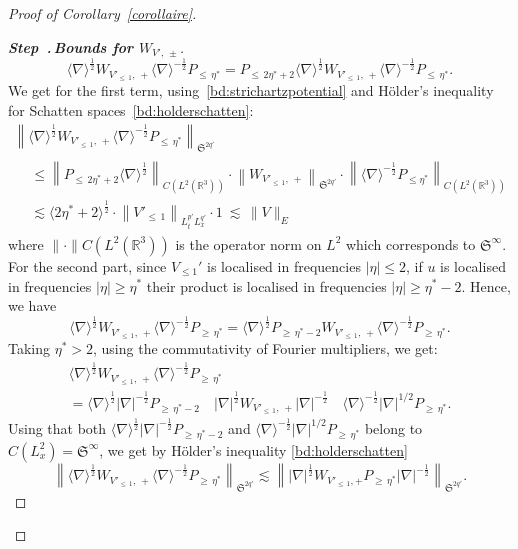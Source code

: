 \documentclass[AHL, Unicode, longabstracts,published]{cedram}
\newcommand{\R}{\mathbb{R}}
\newcommand{\frkS}{\mathfrak{S}}
\newcommand{\an}[1]{\langle #1 \rangle}
\newcounter{stepcount}
\newenvironment{step}[1]{\refstepcounter{stepcount}\begin{proof}[{\bf{Step~\thestepcount}{.\,\emph{#1}}}]}{\let\qed\relax\end{proof}}
\begin{document}
\begin{proof}[Proof of Corollary~\ref{corollaire}]
\begin{step}{{Bounds for $W_{V',\,\pm}$}}
\[
\an{\nabla}^{\frac12} W_{V'_{\leq\,1},\,+}\an{\nabla}^{-\frac12} P_{\leq\,\eta^*} = P_{\leq\,2\eta^*+2} \an{\nabla}^{\frac12} W_{V'_{\leq\,1},\,+}\an{\nabla}^{-\frac12} P_{\leq\,\eta^*}.
\]
We get for the first term, using~\eqref{bd:strichartzpotential} and H\"older's inequality for Schatten spaces~\eqref{bd:holderschatten}:
\begin{multline}\label{bc:interWV2}
\left\| \langle \nabla \rangle^{\frac 12}W_{V'_{\leq\, 1},\,+} \langle \nabla \rangle^{-\frac 12} P_{\leq\, \eta^*}\right\|_{\frkS^{2q'}}
\\
\begin{aligned}
&\leq \left\| P_{\leq\,2\eta^* +2}\langle \nabla \rangle^{\frac 12}\right\|_{C\left(L^2\left(\R^3\right)\right)} \cdot \left\| W_{V'_{\leq\,1},\,+} \right\|_{\frkS^{2q'}} \cdot \left\| \langle \nabla \rangle^{-\frac 12} P_{\leq \eta^*}\right\|_{C\left(L^2\left(\R^3\right)\right)}\\
&\lesssim \an{2 \eta^* + 2}^{\frac12} \cdot \left\| V'_{\leq\,1} \right\|_{L^{p'}_tL^{q'}_x}\cdot 1 \ \lesssim \, \| V\|_{E}
\end{aligned}
\end{multline}
where $ \|\cdot \|{C(L^2(\R^3))}$ is the operator norm on $L^2$ which corresponds to $\frkS^\infty$. For the second part, since $V_{\leq 1}'$ is localised in frequencies $|\eta|\leq 2$, if $u$ is localised in frequencies $|\eta|\geq \eta^*$ their product is localised in frequencies $|\eta|\geq \eta^* -2$. Hence, we have
\[
\langle \nabla \rangle^{\frac 12}W_{V'_{\leq\,1},\,+} \langle \nabla \rangle^{-\frac 12} P_{\geq\,\eta^*} = \langle \nabla \rangle^{\frac 12}P_{\geq\,\eta^* -2}W_{V'_{\leq\,1},\,+} \langle \nabla \rangle^{-\frac 12} P_{\geq\,\eta^*}.
\]
Taking $\eta^* > 2$, using the commutativity of Fourier multipliers, we get:
\begin{multline*}
\langle \nabla \rangle^{\frac 12}W_{V'_{\leq\,1},\,+} \langle \nabla \rangle^{-\frac 12} P_{\geq\,\eta^*}\\
= \langle \nabla \rangle^{\frac 12} |\nabla|^{-\frac12}P_{\geq\,\eta^* -2} \quad |\nabla|^{\frac12} W_{V'_{\leq\,1},\,+} |\nabla|^{-\frac12}\quad \langle \nabla \rangle^{-\frac 12}|\nabla|^{1/2} P_{\geq\, \eta^*}.
\end{multline*}
Using that both $ \langle \nabla \rangle^{\frac 12} |\nabla|^{-\frac12}P_{\geq\,\eta^* -2} $ and $\langle \nabla \rangle^{-\frac 12}|\nabla|^{1/2} P_{\geq \,\eta^*}$ belong to $C(L^2_x) = \frkS^\infty$, we get by H\"older's inequality \eqref{bd:holderschatten}
\[
\left\| \langle \nabla \rangle^{\frac 12}W_{V'_{\leq\, 1},\,+} \langle \nabla \rangle^{-\frac 12} P_{\geq \,\eta^*} \right\|_{\frkS^{2q'}}\lesssim \left\| |\nabla |^{\frac 12}W_{V'_{\leq\,1},+}P_{\geq\,\eta^*} |\nabla |^{-\frac 12} \right\|_{\frkS^{2q'}}.
\]
\end{step}
\end{proof}
\end{document}
